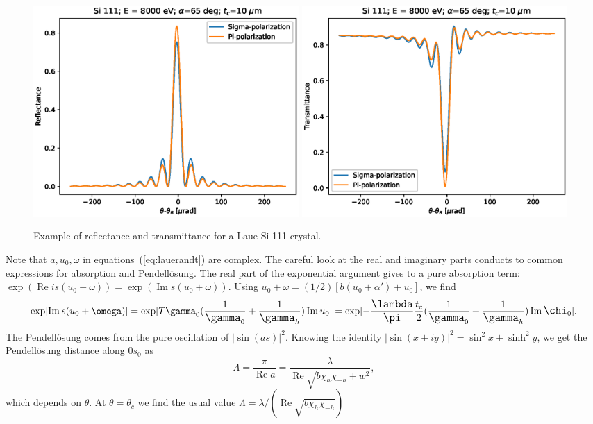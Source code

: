 \documentclass[preprint]{iucr}              %
\newcommand{\inred}[1]{{\color{red}#1}}
\begin{document}
\begin{figure}\label{fig:laueProfiles}
    \centering
    \includegraphics[width=0.49\textwidth]{figures/Laue_1.eps}
    \includegraphics[width=0.49\textwidth]{figures/Laue_2.eps}
    \caption{Example of reflectance and transmittance for a Laue Si 111 crystal.}
\end{figure}

\inred{
Note that $a, u_0, \omega$ in equations~(\ref{eq:lauerandt}) are complex. The careful look at the real and imaginary parts conducts to common expressions for absorption and Pendell\"osung. The real part of the exponential argument gives to a pure absorption term:  
$\exp(\operatorname{Re} i s (u_0+\omega))
= \exp(\operatorname{Im} s (u_0 + \omega))$. Using $u_0 + \omega = (1/2)[b(u_0+\alpha')+u_0]$, we find
\begin{equation}
    \exp[\operatorname{Im} s (u_0+\omega)] = \exp[T \gamma_0 \large( \frac{1}{\gamma_0} + \frac{1}{\gamma_h} \large) \operatorname{Im} u_0] = \exp[-\frac{\lambda}{\pi} \frac{t_c}{2} \large( \frac{1}{\gamma_0} + \frac{1}{\gamma_h} \large) \operatorname{Im} \chi_0].
\end{equation}
The Pendell\"osung comes from the pure oscillation of $|\sin(as)|^2$. Knowing the identity $|\sin(x+iy)|^2=\sin^2x + \sinh^2 y$, we get the Pendell\"osung distance along $0s_0$ as 
\begin{equation}
    \Lambda = \frac{\pi}{\operatorname{Re} a}=\frac{\lambda}{\operatorname{Re}\sqrt{b\chi_h\chi_{-h} + w^2}},
\end{equation}
which depends on $\theta$. At $\theta=\theta_c$ we find the usual value $\Lambda=\lambda/(\operatorname{Re}\sqrt{b \chi_h \chi_{-h}})$ 
}
\end{document}
